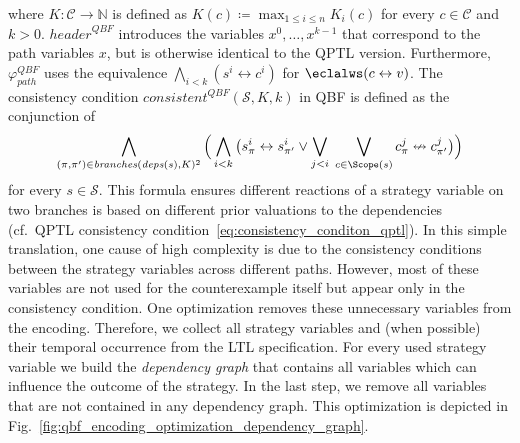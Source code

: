 \documentclass{LMCS}
\newcommand{\deps}{\mathit{deps}}
\newcommand{\branches}{\mathit{branches}}
\newcommand{\header}{\mathit{header}}
\newcommand{\consistent}{\mathit{consistent}}
\theoremstyle{plain}\newtheorem{theorem}[thm]{Theorem}
\theoremstyle{plain}\newtheorem{lemma}[thm]{Lemma}
\theoremstyle{plain}\newtheorem{proposition}[thm]{Proposition}
\theoremstyle{plain}\newtheorem{corollary}[thm]{Corollary}
\theoremstyle{definition}\newtheorem{definition}{Definition}[section]
\begin{document}
where $K : \mathcal{C} \rightarrow \mathbb{N}$ is defined as $K(c) \coloneqq \max_{1 \leq i \leq n} K_i(c)$ for every $c \in \mathcal{C}$ and $k > 0$.
$\header^\mathit{QBF}$ introduces the variables $x^0, \dots, x^{k-1}$ that correspond to the path variables $x$, but is otherwise identical to the QPTL version.
Furthermore, $\varphi_\mathit{path}^\mathit{QBF}$ uses the equivalence $\bigwedge_{i < k} ( s^i \leftrightarrow c^i )$ for $\eclalws (c \leftrightarrow v)$.
The consistency condition $\consistent^\mathit{QBF}(\mathcal{S}, K, k)$ in QBF is defined as the conjunction of
\begin{equation*}
  \bigwedge_{(\pi,\pi') \in \branches(\deps(s),K)^2} \Big( \bigwedge_{i < k} \big( s_\pi^i \leftrightarrow s_{\pi'}^i \lor \bigvee_{j < i} \;\bigvee_{c \in \Scope(s)} c_\pi^j \nleftrightarrow c_{\pi'}^j \big) \Big)
\end{equation*}
for every $s \in \mathcal{S}$.
This formula ensures different reactions of a strategy variable on two branches is based on different prior valuations to the dependencies (cf.~QPTL consistency condition~\eqref{eq:consistency_conditon_qptl}).
In this simple translation, one cause of high complexity is due to the consistency conditions between the strategy variables across different paths.
However, most of these variables are not used for the counterexample itself but appear only in the consistency condition.
One optimization removes these unnecessary variables from the encoding.
Therefore, we collect all strategy variables and (when possible) their temporal occurrence from the LTL specification.
For every used strategy variable we build the \emph{dependency graph} that contains all variables which can influence the outcome of the strategy.
In the last step, we remove all variables that are not contained in any dependency graph.
This optimization is depicted in Fig.~\ref{fig:qbf_encoding_optimization_dependency_graph}.
\end{document}
